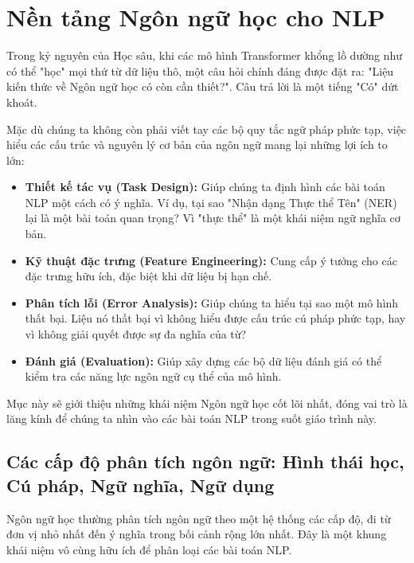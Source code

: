 
\section{Nền tảng Ngôn ngữ học cho NLP}
\label{sec:nen_tang_ngon_ngu_hoc}

Trong kỷ nguyên của Học sâu, khi các mô hình Transformer khổng lồ dường như có thể "học" mọi thứ từ dữ liệu thô, một câu hỏi chính đáng được đặt ra: "Liệu kiến thức về Ngôn ngữ học có còn cần thiết?". Câu trả lời là một tiếng "Có" dứt khoát.

Mặc dù chúng ta không còn phải viết tay các bộ quy tắc ngữ pháp phức tạp, việc hiểu các cấu trúc và nguyên lý cơ bản của ngôn ngữ mang lại những lợi ích to lớn:
\begin{itemize}
    \item \textbf{Thiết kế tác vụ (Task Design):} Giúp chúng ta định hình các bài toán NLP một cách có ý nghĩa. Ví dụ, tại sao "Nhận dạng Thực thể Tên" (NER) lại là một bài toán quan trọng? Vì "thực thể" là một khái niệm ngữ nghĩa cơ bản.
    \item \textbf{Kỹ thuật đặc trưng (Feature Engineering):} Cung cấp ý tưởng cho các đặc trưng hữu ích, đặc biệt khi dữ liệu bị hạn chế.
    \item \textbf{Phân tích lỗi (Error Analysis):} Giúp chúng ta hiểu tại sao một mô hình thất bại. Liệu nó thất bại vì không hiểu được cấu trúc cú pháp phức tạp, hay vì không giải quyết được sự đa nghĩa của từ?
    \item \textbf{Đánh giá (Evaluation):} Giúp xây dựng các bộ dữ liệu đánh giá có thể kiểm tra các năng lực ngôn ngữ cụ thể của mô hình.
\end{itemize}

Mục này sẽ giới thiệu những khái niệm Ngôn ngữ học cốt lõi nhất, đóng vai trò là lăng kính để chúng ta nhìn vào các bài toán NLP trong suốt giáo trình này.

\subsection{Các cấp độ phân tích ngôn ngữ: Hình thái học, Cú pháp, Ngữ nghĩa, Ngữ dụng}
\label{ssec:cap_do_phan_tich}

Ngôn ngữ học thường phân tích ngôn ngữ theo một hệ thống các cấp độ, đi từ đơn vị nhỏ nhất đến ý nghĩa trong bối cảnh rộng lớn nhất. Đây là một khung khái niệm vô cùng hữu ích để phân loại các bài toán NLP.

